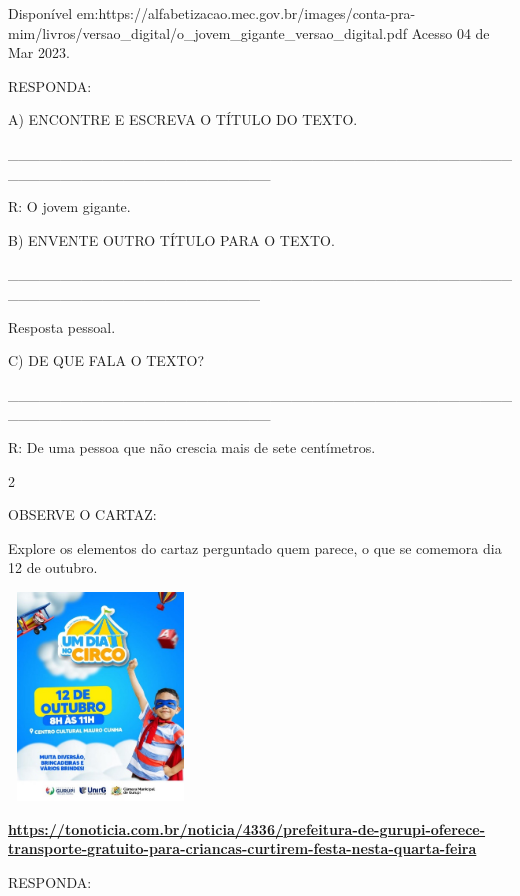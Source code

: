 {{Disponível
em:https://alfabetizacao.mec.gov.br/images/conta-pra-mim/livros/versao\_digital/o\_jovem\_gigante\_versao\_digital.pdf
Acesso 04 de Mar 2023.

RESPONDA:

A) ENCONTRE E ESCREVA O TÍTULO DO TEXTO.

\_\_\_\_\_\_\_\_\_\_\_\_\_\_\_\_\_\_\_\_\_\_\_\_\_\_\_\_\_\_\_\_\_\_\_\_\_\_\_\_\_\_\_\_\_\_\_\_\_\_\_\_\_\_\_\_\_\_\_\_\_\_\_\_\_\_\_\_\_\_\_\_\_

R: O jovem gigante.

B) ENVENTE OUTRO TÍTULO PARA O TEXTO.

\_\_\_\_\_\_\_\_\_\_\_\_\_\_\_\_\_\_\_\_\_\_\_\_\_\_\_\_\_\_\_\_\_\_\_\_\_\_\_\_\_\_\_\_\_\_\_\_\_\_\_\_\_\_\_\_\_\_\_\_\_\_\_\_\_\_\_\_\_\_\_\_

Resposta pessoal.

C) DE QUE FALA O TEXTO?

\_\_\_\_\_\_\_\_\_\_\_\_\_\_\_\_\_\_\_\_\_\_\_\_\_\_\_\_\_\_\_\_\_\_\_\_\_\_\_\_\_\_\_\_\_\_\_\_\_\_\_\_\_\_\_\_\_\_\_\_\_\_\_\_\_\_\_\_\_\_\_\_\_

R: De uma pessoa que não crescia mais de sete centímetros.

\num{2}

OBSERVE O CARTAZ:

Explore os elementos do cartaz perguntado quem parece, o que se comemora
dia 12 de outubro.

\includegraphics[width=1.92500in,height=2.18056in]{media/image119.jpeg}

\protect\hypertarget{_heading=h.t2raxp5v2ex8}{}{}

\href{https://tonoticia.com.br/noticia/4336/prefeitura-de-gurupi-oferece-transporte-gratuito-para-criancas-curtirem-festa-nesta-quarta-feira}{\textbf{https://tonoticia.com.br/noticia/4336/prefeitura-de-gurupi-oferece-transporte-gratuito-para-criancas-curtirem-festa-nesta-quarta-feira}}

RESPONDA:

}}
